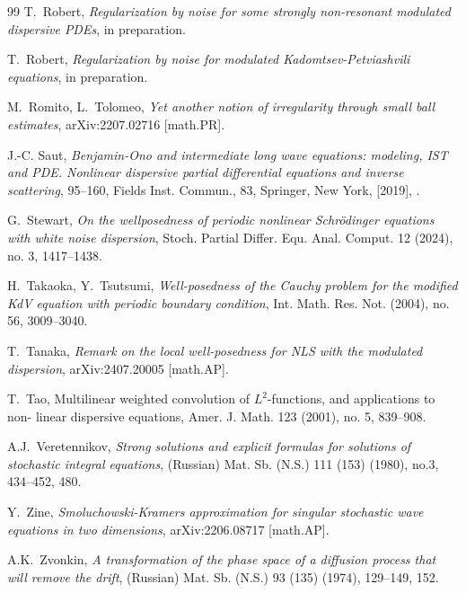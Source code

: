 \documentclass[letterpaper, 11pt,  reqno]{amsart}
\newcommand{\1}{\hspace{0.5mm}\text{I}\hspace{0.5mm}}
\numberwithin{equation}{section}
\numberwithin{theorem}{section}
\begin{document}
\begin{thebibliography}{99}
T.~Robert, 
{\it Regularization by noise for some strongly non-resonant modulated dispersive PDEs}, 
 in preparation.


T.~Robert, 
{\it  Regularization by noise for modulated Kadomtsev-Petviashvili equations}, 
 in preparation.



M.~Romito, L.~Tolomeo, 
{\it Yet another notion of irregularity through small ball estimates},
arXiv:2207.02716 [math.PR].

%
%
%
	
J.-C. Saut,
 {\it Benjamin-Ono and intermediate long wave equations: modeling, IST and PDE. Nonlinear
dispersive partial differential equations and inverse scattering}, 
95--160, Fields Inst. Commun., 83, Springer, New York, [2019], .
	


%
%

G.~Stewart, 
{\it On the wellposedness of periodic nonlinear Schr\"odinger equations with white noise dispersion}, 
Stoch. Partial Differ. Equ. Anal. Comput. 12 (2024), no. 3, 1417--1438.



H.~Takaoka, Y.~Tsutsumi, 
{\it Well-posedness of the Cauchy problem for the modified KdV equation with periodic boundary condition},
 Int. Math. Res. Not. (2004), no. 56, 3009--3040. 


T.~Tanaka, 
{\it Remark on the local well-posedness for NLS with the modulated dispersion}, 
arXiv:2407.20005 [math.AP].


T.~Tao, 
{Multilinear weighted convolution of $L^2$-functions, and applications to non-
linear dispersive equations}, Amer. J. Math. 123 (2001), no. 5, 839--908.








A.J.~Veretennikov,
{\it Strong solutions and explicit formulas for solutions of stochastic integral equations},
(Russian) Mat. Sb. (N.S.) 111 (153) (1980), no.3, 434--452, 480.





Y.~Zine, 
{\it Smoluchowski-Kramers approximation for singular stochastic wave equations in two dimensions},
arXiv:2206.08717 [math.AP].



A.K.~Zvonkin, 
{\it A transformation of the phase space of a diffusion process that will remove the drift}, 
(Russian)
Mat. Sb. (N.S.) 93 (135) (1974), 129--149, 152. 





\end{thebibliography}
\end{document}
